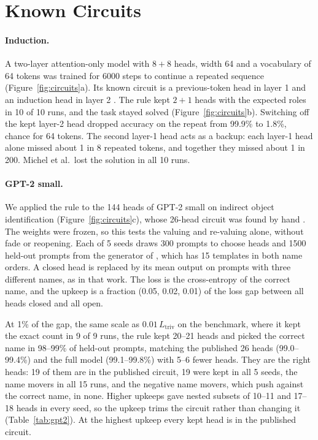 \documentclass[letterpaper]{article} %
\newcommand{\Ltriv}{L_{\mathrm{triv}}}
\begin{document}
\section{Known Circuits}

\paragraph{Induction.} A two-layer attention-only model with $8+8$ heads, width 64 and a vocabulary of 64 tokens was trained for 6000 steps to continue a repeated sequence (Figure~\ref{fig:circuits}a). Its known circuit is a previous-token head in layer 1 and an induction head in layer 2 \citep{olsson2022}. The rule kept $2+1$ heads with the expected roles in 10 of 10 runs, and the task stayed solved (Figure~\ref{fig:circuits}b). Switching off the kept layer-2 head dropped accuracy on the repeat from 99.9\% to 1.8\%, chance for 64 tokens. The second layer-1 head acts as a backup: each layer-1 head alone missed about 1 in 8 repeated tokens, and together they missed about 1 in 200. Michel et al.\ lost the solution in all 10 runs.

\paragraph{GPT-2 small.} We applied the rule to the 144 heads of GPT-2 small on indirect object identification (Figure~\ref{fig:circuits}c), whose 26-head circuit was found by hand \citep{wang2023interpretability}. The weights were frozen, so this tests the valuing and re-valuing alone, without fade or reopening. Each of 5 seeds draws 300 prompts to choose heads and 1500 held-out prompts from the generator of \citet{wang2023interpretability}, which has 15 templates in both name orders. A closed head is replaced by its mean output on prompts with three different names, as in that work. The loss is the cross-entropy of the correct name, and the upkeep is a fraction (0.05, 0.02, 0.01) of the loss gap between all heads closed and all open.

At 1\% of the gap, the same scale as $0.01\,\Ltriv$ on the benchmark, where it kept the exact count in 9 of 9 runs, the rule kept 20--21 heads and picked the correct name in 98--99\% of held-out prompts, matching the published 26 heads (99.0--99.4\%) and the full model (99.1--99.8\%) with 5--6 fewer heads. They are the right heads: 19 of them are in the published circuit, 19 were kept in all 5 seeds, the name movers in all 15 runs, and the negative name movers, which push against the correct name, in none. Higher upkeeps gave nested subsets of 10--11 and 17--18 heads in every seed, so the upkeep trims the circuit rather than changing it (Table~\ref{tab:gpt2}). At the highest upkeep every kept head is in the published circuit.
\end{document}
